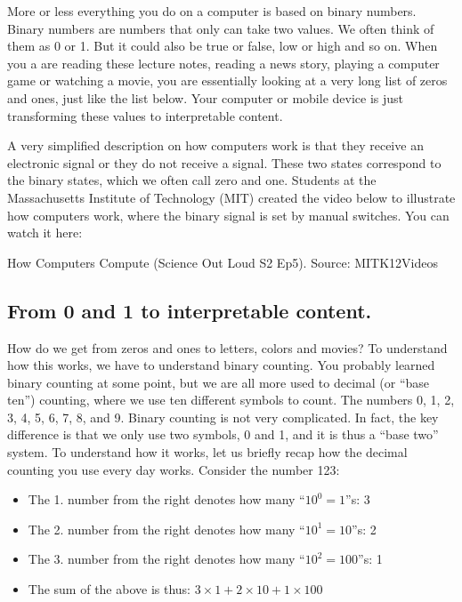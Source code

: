 \documentclass[]{book}
\providecommand{\tightlist}{%
  \setlength{\itemsep}{0pt}\setlength{\parskip}{0pt}}
\begin{document}
More or less everything you do on a computer is based on binary numbers. Binary numbers are numbers that only can take two values. We often think of them as 0 or 1. But it could also be true or false, low or high and so on. When you a are reading these lecture notes, reading a news story, playing a computer game or watching a movie, you are essentially looking at a very long list of zeros and ones, just like the list below. Your computer or mobile device is just transforming these values to interpretable content.

A very simplified description on how computers work is that they receive an electronic signal or they do not receive a signal. These two states correspond to the binary states, which we often call zero and one. Students at the Massachusetts Institute of Technology (MIT) created the video below to illustrate how computers work, where the binary signal is set by manual switches. You can watch it here:

\label{fig:store1}How Computers Compute (Science Out Loud S2 Ep5). Source: MITK12Videos

\hypertarget{from-0-and-1-to-interpretable-content.}{%
\subsection{From 0 and 1 to interpretable content.}\label{from-0-and-1-to-interpretable-content.}}

How do we get from zeros and ones to letters, colors and movies? To understand how this works, we have to understand binary counting. You probably learned binary counting at some point, but we are all more used to decimal (or ``base ten'') counting, where we use ten different symbols to count. The numbers 0, 1, 2, 3, 4, 5, 6, 7, 8, and 9. Binary counting is not very complicated. In fact, the key difference is that we only use two symbols, 0 and 1, and it is thus a ``base two'' system. To understand how it works, let us briefly recap how the decimal counting you use every day works.
Consider the number 123:

\begin{itemize}
\tightlist
\item
  The 1. number from the right denotes how many ``\(10^0=1\)''s: 3
\item
  The 2. number from the right denotes how many ``\(10^1=10\)''s: 2
\item
  The 3. number from the right denotes how many ``\(10^2=100\)''s: 1
\item
  The sum of the above is thus: \(3 \times 1+2\times 10+1\times 100\)
\end{itemize}
\end{document}
